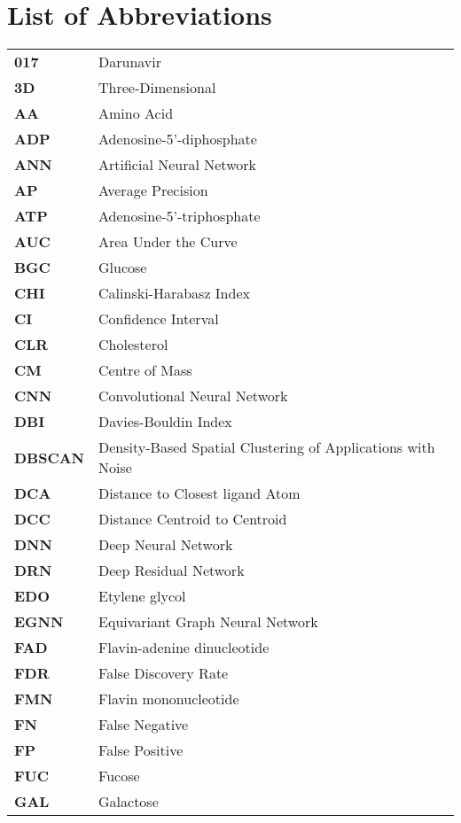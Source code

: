 \chapter*{List of Abbreviations}

\begin{longtable}[l]{@{}p{2.5cm}p{12cm}@{}}
\textbf{017} & Darunavir \\
\textbf{3D} & Three-Dimensional \\
\textbf{AA} & Amino Acid \\
\textbf{ADP} & Adenosine-5'-diphosphate \\
\textbf{ANN} & Artificial Neural Network \\
\textbf{AP} & Average Precision \\
\textbf{ATP} & Adenosine-5’-triphosphate \\
\textbf{AUC} & Area Under the Curve \\
\textbf{BGC} & Glucose \\
\textbf{CHI} & Calinski-Harabasz Index \\
\textbf{CI} & Confidence Interval \\
\textbf{CLR} & Cholesterol \\
\textbf{CM} & Centre of Mass \\
\textbf{CNN} & Convolutional Neural Network \\
\textbf{DBI} & Davies-Bouldin Index \\
\textbf{DBSCAN} & Density-Based Spatial Clustering of Applications with Noise \\
\textbf{DCA} & Distance to Closest ligand Atom \\
\textbf{DCC} & Distance Centroid to Centroid \\
\textbf{DNN} & Deep Neural Network \\
\textbf{DRN} & Deep Residual Network \\
\textbf{EDO} & Etylene glycol \\
\textbf{EGNN} & Equivariant Graph Neural Network \\
\textbf{FAD} & Flavin-adenine dinucleotide \\
\textbf{FDR} & False Discovery Rate \\
\textbf{FMN} & Flavin mononucleotide \\
\textbf{FN} & False Negative \\
\textbf{FP} & False Positive \\
\textbf{FUC} & Fucose \\
\textbf{GAL} & Galactose \\

\end{longtable}
